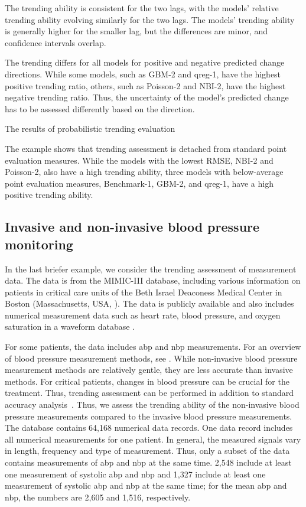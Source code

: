 The trending ability is consistent for the two lags, with the models' relative trending ability evolving similarly for the two lags.
The models' trending ability is generally higher for the smaller lag, but the differences are minor, and confidence intervals overlap.

The trending differs for all models for positive and negative predicted change directions.
While some models, such as GBM-2 and qreg-1, have the highest positive trending ratio, others, such as Poisson-2 and NBI-2, have the highest negative trending ratio.
Thus, the uncertainty of the model's predicted change has to be assessed differently based on the direction.

The results of probabilistic trending evaluation 

The example shows that trending assessment is detached from standard point evaluation measures.
While the models with the lowest RMSE, NBI-2 and Poisson-2, also have a high trending ability, three models with below-average point evaluation measures, Benchmark-1, GBM-2, and qreg-1, have a high positive trending ability.


\subsection{Invasive and non-invasive blood pressure monitoring} \label{sec:application_measurement}

In the last briefer example, we consider the trending assessment of measurement data.
The data is from the MIMIC-III database, including various information on patients in critical care units of the Beth Israel Deaconess Medical Center in Boston (Massachusetts, USA, \cite{Johnson2016}).
The data is publicly available and also includes numerical measurement data such as heart rate, blood pressure, and oxygen saturation in a waveform database \parencites[][]{Moody2017}[available through][]{Goldberger2000}.

For some patients, the data includes \ac{abp} and \ac{nbp} measurements.
For an overview of blood pressure measurement methods, see \textcite{Saugel2014}.
While non-invasive blood pressure measurement methods are relatively gentle, they are less accurate than invasive methods.
For critical patients, changes in blood pressure can be crucial for the treatment.
Thus, trending assessment can be performed in addition to standard accuracy analysis~\parencite[see, e.g., ]{Mostafa2020}.
Thus, we assess the trending ability of the non-invasive blood pressure measurements compared to the invasive blood pressure measurements.
The database contains 64,168 numerical data records.
One data record includes all numerical measurements for one patient.
In general, the measured signals vary in length, frequency and type of measurement.
Thus, only a subset of the data contains measurements of \ac{abp} and \ac{nbp} at the same time.
2,548 include at least one measurement of systolic \ac{abp} and \ac{nbp} and 1,327 include at least one measurement of systolic \ac{abp} and \ac{nbp} at the same time; for the mean \ac{abp} and \ac{nbp}, the numbers are 2,605 and 1,516, respectively.

